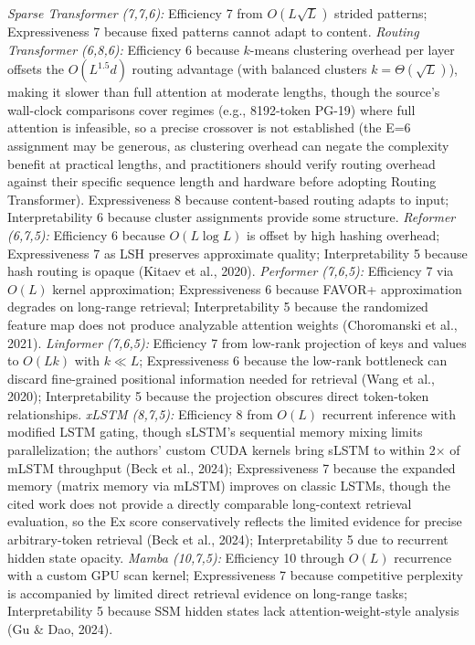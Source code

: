 \documentclass[10pt,twocolumn]{article}
\begin{document}
\textit{Sparse Transformer (7,7,6):} Efficiency 7 from $O(L\sqrt{L})$ strided patterns; Expressiveness 7 because fixed patterns cannot adapt to content.
\textit{Routing Transformer (6,8,6):} Efficiency 6 because $k$-means clustering overhead per layer offsets the $O(L^{1.5} d)$ routing advantage (with balanced clusters $k=\Theta(\sqrt{L})$), making it slower than full attention at moderate lengths, though the source's wall-clock comparisons cover regimes (e.g., 8192-token PG-19) where full attention is infeasible, so a precise crossover is not established (the E=6 assignment may be generous, as clustering overhead can negate the complexity benefit at practical lengths, and practitioners should verify routing overhead against their specific sequence length and hardware before adopting Routing Transformer). Expressiveness 8 because content-based routing adapts to input; Interpretability 6 because cluster assignments provide some structure.
\textit{Reformer (6,7,5):} Efficiency 6 because $O(L \log L)$ is offset by high hashing overhead; Expressiveness 7 as LSH preserves approximate quality; Interpretability 5 because hash routing is opaque (Kitaev et al., 2020).
\textit{Performer (7,6,5):} Efficiency 7 via $O(L)$ kernel approximation; Expressiveness 6 because FAVOR+ approximation degrades on long-range retrieval; Interpretability 5 because the randomized feature map does not produce analyzable attention weights (Choromanski et al., 2021).
\textit{Linformer (7,6,5):} Efficiency 7 from low-rank projection of keys and values to $O(Lk)$ with $k \ll L$; Expressiveness 6 because the low-rank bottleneck can discard fine-grained positional information needed for retrieval (Wang et al., 2020); Interpretability 5 because the projection obscures direct token-token relationships.
\textit{xLSTM (8,7,5):} Efficiency 8 from $O(L)$ recurrent inference with modified LSTM gating, though sLSTM's sequential memory mixing limits parallelization; the authors' custom CUDA kernels bring sLSTM to within 2$\times$ of mLSTM throughput (Beck et al., 2024); Expressiveness 7 because the expanded memory (matrix memory via mLSTM) improves on classic LSTMs, though the cited work does not provide a directly comparable long-context retrieval evaluation, so the Ex score conservatively reflects the limited evidence for precise arbitrary-token retrieval (Beck et al., 2024); Interpretability 5 due to recurrent hidden state opacity.
\textit{Mamba (10,7,5):} Efficiency 10 through $O(L)$ recurrence with a custom GPU scan kernel; Expressiveness 7 because competitive perplexity is accompanied by limited direct retrieval evidence on long-range tasks; Interpretability 5 because SSM hidden states lack attention-weight-style analysis (Gu \& Dao, 2024).
\end{document}
